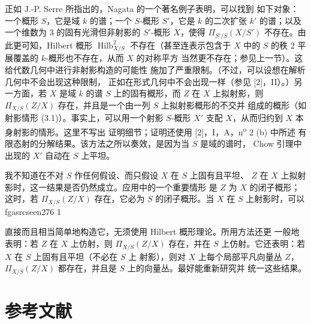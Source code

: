 \documentclass[12pt,twoside,openany]{book}
\numberwithin{equation}{section}
\newcommand{\fgaunitid}{unbound}
\newcommand{\src}[1]{%
  \phantomsection
  \hypertarget{src:\fgaunitid:#1}{}%
  \hypertarget{fga.\fgaunitid.p#1}{}%
  \ifcsname fgasrcseen#1\endcsname\else
    \expandafter\gdef\csname fgasrcseen#1\endcsname{1}%
    \hypertarget{src:#1}{}%
  \fi
  \marginpar{\raggedleft\footnotesize\sffamily #1}%
}
\theoremstyle{plain}
\theoremstyle{definition}
\theoremstyle{remark}
\begin{document}
正如 J.-P. Serre 所指出的，Nagata 的一个著名例子表明，可以找到
如下对象：一个概形 $S$，它是域 $k$ 的谱；一个 $S$-概形 $S'$，它是
$k$ 的二次扩张 $k'$ 的谱；以及一个维数为 3 的固有光滑但非射影的
$S'$-概形 $X$，使得 $\Pi_{S'/S}(X/S')$ 不存在。由此更可知，Hilbert
概形 $\operatorname{Hilb}^2_{X/S}$ 不存在（甚至连表示包含于 $X$
中的 $S$ 的秩 2 平展覆盖的 $k$-概形也不存在，从而 $X$ 的对称平方
当然更不存在；参见上一节）。这给代数几何中进行非射影构造的可能性
施加了严重限制。（不过，可以设想在解析几何中不会出现这种限制，
正如在形式几何中不会出现一样（参见 [2]，II）。）另一方面，若 $X$
是域 $k$ 的谱 $S$ 上的固有概形，而 $Z$ 在 $X$ 上拟射影，则
$\Pi_{X/S}(Z/X)$ 存在，并且是一个由一列 $S$ 上拟射影概形的不交并
组成的概形（如射影情形 (3.1)）。事实上，可以用一个射影
$S$-概形 $X'$ 支配 $X$，从而归约到 $X$ 本身射影的情形。这里不写出
证明细节；证明还使用 [2]，I，A，n\textsuperscript{o} 2 (b) 中所述
有限态射的分解结果。该方法之所以奏效，是因为当 $S$ 是域的谱时，
Chow 引理中出现的 $X'$ 自动在 $S$ 上平坦。

我不知道在不对 $S$ 作任何假设、而只假设 $X$ 在 $S$ 上固有且平坦、
$Z$ 在 $X$ 上拟射影时，这一结果是否仍然成立。应用中的一个重要情形
是 $Z$ 为 $X$ 的闭子概形；这时，若 $\Pi_{X/S}(Z/X)$ 存在，它必为
$S$ 的闭子概形。当 $X$ 在 $S$ 上射影时，可以
\src{276}
直接而且相当简单地构造它，无须使用 Hilbert 概形理论。所用方法还更
一般地表明：若 $Z$ 在 $X$ 上仿射，则 $\Pi_{X/S}(Z/X)$ 存在，并在
$S$ 上仿射。它还表明：若 $X$ 在 $S$ 上固有且平坦（不必在 $S$ 上
射影），则对 $X$ 上每个局部平凡向量丛 $Z$，
$\Pi_{X/S}(Z/X)$ 都存在，并且是 $S$ 上的向量丛。最好能重新研究并
统一这些结果。

\section*{参考文献}
\end{document}
